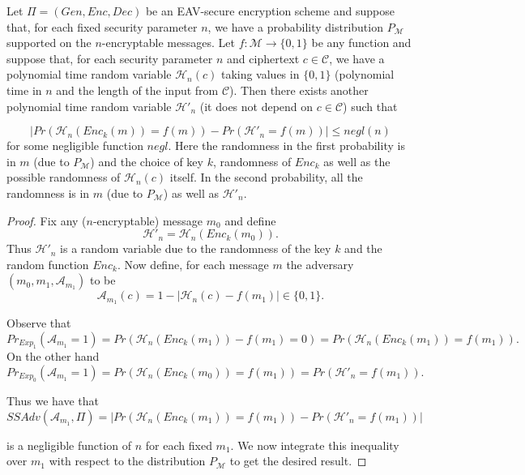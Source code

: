 \documentclass[twoside, a4paper, 10pt]{amsart}
\begin{document}
\begin{prop} Let $\Pi = (Gen, Enc, Dec)$ be an EAV-secure encryption scheme and suppose that, for each fixed security parameter $n$, we have a probability distribution $P_{\mathcal{M}}$ supported on the $n$-encryptable messages. Let $f:\mathcal{M} \to \{0,1\}$ be any function and suppose that, for each security parameter $n$ and ciphertext $c \in \mathcal{C}$, we have a polynomial time random variable $\mathcal{H}_n(c)$ taking values in $\{0,1\}$ (polynomial time in $n$ and the length of the input from $\mathcal{C}$). Then there exists another polynomial time random variable $\mathcal{H}'_n$ (it does not depend on $c \in \mathcal{C}$) such that 

$$| Pr(\mathcal{H}_n(Enc_k(m)) = f(m)) - Pr(\mathcal{H}'_n = f(m)) | \leq negl(n)$$ for some negligible function $negl$. Here the randomness in the first probability is in $m$ (due to $P_{\mathcal{M}}$) and the choice of key $k$, randomness of $Enc_k$ as well as the possible randomness of $\mathcal{H}_n(c)$ itself. In the second probability, all the randomness is in $m$ (due to $P_{\mathcal{M}}$) as well as $\mathcal{H}'_n$.

\end{prop}

\begin{proof} Fix any ($n$-encryptable) message $m_0$ and define $$\mathcal{H}'_n = \mathcal{H}_n(Enc_k(m_0)).$$ Thus $\mathcal{H}'_n$ is a random variable due to the randomness of the key $k$ and the random function $Enc_k$. Now define, for each message $m$ the adversary $(m_0, m_1, \mathcal{A}_{m_1})$ to be $$\mathcal{A}_{m_1}(c) = 1 - |\mathcal{H}_n(c) -  f(m_1)| \in \{0, 1\}.$$

Observe that $$Pr_{Exp_1}(\mathcal{A}_{m_1} = 1) = Pr(\mathcal{H}_n(Enc_k(m_1)) -  f(m_1) = 0) =  Pr(\mathcal{H}_n(Enc_k(m_1)) =  f(m_1)). $$ 
On the other hand $$Pr_{Exp_0}(\mathcal{A}_{m_1} = 1) = Pr(\mathcal{H}_n(Enc_k(m_0)) =  f(m_1)) = Pr(\mathcal{H}'_n = f(m_1)).$$

Thus we have that $$ SSAdv(\mathcal{A}_{m_1}, \Pi) = | Pr(\mathcal{H}_n(Enc_k(m_1)) =  f(m_1)) - Pr(\mathcal{H}'_n = f(m_1)) |$$

is a negligible function of $n$ for each fixed $m_1$. We now integrate this inequality over $m_1$ with respect to the distribution $P_{\mathcal{M}}$ to get the desired result. \end{proof}
\end{document}
